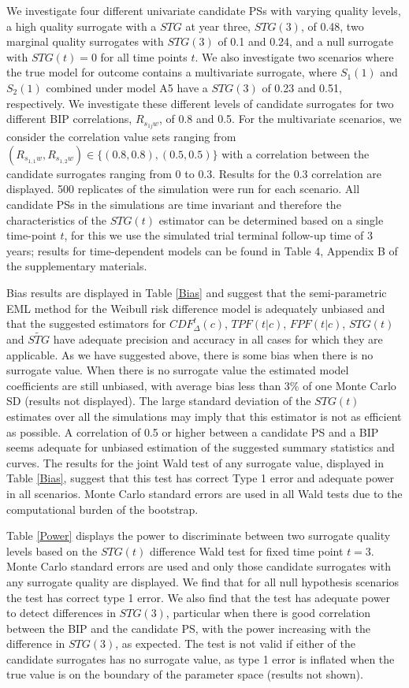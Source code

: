 \documentclass[times, doublespace]{simauth}
\begin{document}
We investigate four different univariate candidate PSs with varying quality levels, a high quality surrogate with a $STG$ at year three, $STG(3)$, of 0.48, two marginal quality surrogates with $STG(3)$ of 0.1 and 0.24, and a null surrogate with $STG(t)=0$ for all time points $t$. We also investigate two scenarios where the true model for outcome contains a multivariate surrogate, where $S_1(1)$ and $S_2(1)$ combined under model A5 have a $STG(3)$ of 0.23 and 0.51, respectively. We investigate these different levels of candidate surrogates for two different BIP correlations, $R_{s_{1j}w}$, of 0.8 and 0.5. For the multivariate scenarios, we consider the correlation value sets ranging from $(R_{s_{1,1}w},R_{s_{1,2}w})\in\{(0.8,0.8), (0.5, 0.5)\}$ with a correlation between the candidate surrogates ranging from 0 to 0.3. Results for the 0.3 correlation are displayed. 500 replicates of the simulation were run for each scenario. All candidate PSs in the simulations are time invariant and therefore the characteristics of the $STG(t)$ estimator can be determined based on a single time-point $t$, for this we use the simulated trial terminal follow-up time of  3 years; results for time-dependent models can be found in Table 4, Appendix B of the supplementary materials. 

Bias results are displayed in Table \ref{Bias} and suggest that the semi-parametric EML method for the Weibull risk difference model is adequately unbiased and that the suggested estimators for $CDF^{t}_{\Delta}(c)$, $TPF(t|c)$, $FPF(t|c)$, $STG(t)$ and $\widetilde{STG}$ have adequate precision and accuracy in all cases for which they are applicable. As we have suggested above, there is some bias when there is no surrogate value. When there is no surrogate value the estimated model coefficients are still unbiased, with average bias less than 3\% of one Monte Carlo SD (results not displayed). The large standard deviation of the $STG(t)$ estimates over all the simulations may imply that this estimator is not as efficient as possible. A correlation of 0.5 or higher between a candidate PS and a BIP seems adequate for unbiased estimation of the suggested summary statistics and curves. The results for the joint Wald test of any surrogate value, displayed in Table \ref{Bias}, suggest that this test has correct Type 1 error and adequate power in all scenarios. Monte Carlo standard errors are used in all Wald tests due to the computational burden of the bootstrap.

Table \ref{Power} displays the power to discriminate between two surrogate quality levels based on the $STG(t)$ difference Wald test for fixed time point $t=3$. Monte Carlo standard errors are used and only those candidate surrogates with any surrogate quality are displayed. We find that for all null hypothesis scenarios the test has correct type 1 error. We also find that the test has adequate power to detect differences in $STG(3)$, particular when there is good correlation between the BIP and the candidate PS, with the power increasing with the difference in $STG(3)$, as expected. The test is not valid if either of the candidate surrogates has no surrogate value, as type 1 error is inflated when the true value is on the boundary of the parameter space (results not shown). 
\end{document}
